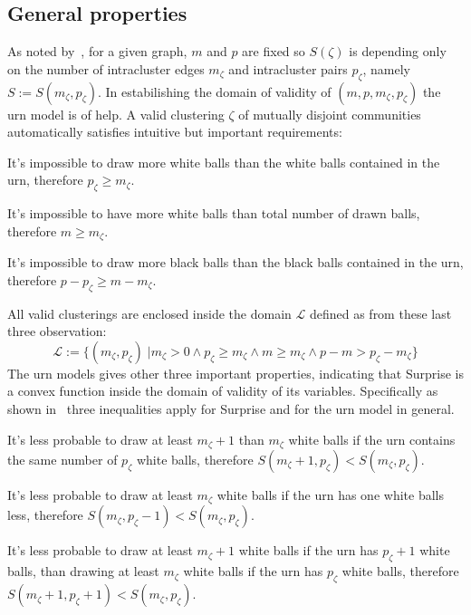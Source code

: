 \subsection{General properties}
As noted by~\cite{fleck2014}, for a given graph, $m$ and $p$ are fixed so $S(\zeta)$ is depending only on the number of intracluster edges $m_\zeta$ and intracluster pairs $p_\zeta$, namely $S:=S(m_\zeta,p_\zeta)$.
In estabilishing the domain of validity of $(m,p,m_\zeta,p_\zeta)$ the urn model is of help. A valid clustering $\zeta$ of mutually disjoint communities automatically satisfies intuitive but important requirements:
\begin{obs}
It's impossible to draw more white balls than the white balls contained in the urn, therefore $p_\zeta \geq m_\zeta$.
\end{obs}
\begin{obs}
It's impossible to have more white balls than total number of drawn balls, therefore $m\geq m_\zeta$.
\end{obs}
\begin{obs}
It's impossible to draw more black balls than the black balls contained in the urn, therefore $p-p_\zeta \geq m-m_\zeta$.
\end{obs}
All valid clusterings are enclosed inside the domain $\mathcal{L}$ defined as from these last three observation:
\begin{equation}
\mathcal{L} := \{ ( m_\zeta,p_\zeta) \; | m_\zeta > 0 \land p_\zeta \geq m_\zeta \land m \geq m_\zeta \land p-m > p_\zeta - m_\zeta \}
\end{equation}
The urn models gives other three important properties, indicating that Surprise is a convex function inside the domain of validity of its variables. Specifically as shown in~\cite{fleck2014} three inequalities apply for Surprise and for the urn model in general.
\begin{props}\label{prop:prop1}
\label{list:surprise_properties} It's less probable to draw at least $m_\zeta+1$ than $m_\zeta$ white balls if the urn contains the same number of $p_\zeta$ white balls, therefore $S(m_\zeta+1,p_\zeta) < S(m_\zeta,p_\zeta)$.
\end{props}
\begin{props}\label{prop:prop2}
It's less probable to draw at least $m_\zeta$ white balls if the urn has one white balls less, therefore $S(m_\zeta,p_\zeta-1) < S(m_\zeta,p_\zeta)$.
\end{props}
\begin{props}\label{prop:prop3}
It's less probable to draw at least $m_\zeta+1$ white balls if the urn has $p_\zeta+1$ white balls, than drawing at least $m_\zeta$ white balls if the urn has $p_\zeta$ white balls, therefore $S(m_\zeta+1,p_\zeta+1) < S(m_\zeta,p_\zeta)$.
\end{props}
